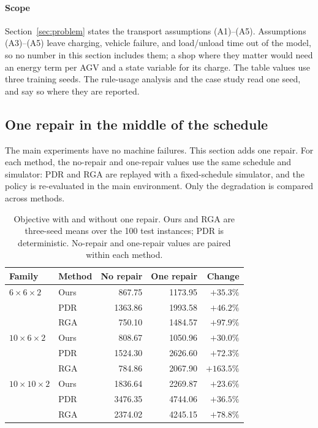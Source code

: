 \paragraph{Scope} Section~\ref{sec:problem} states the transport
assumptions (A1)--(A5).
Assumptions (A3)--(A5) leave charging, vehicle failure, and load/unload time
out of the model, so no number in this section includes them; a shop where
they matter would need an energy term per AGV and a state variable for its
charge.
The table values use three training seeds. The rule-usage analysis and the
case study read one seed, and say so where they are reported.




\subsection{One repair in the middle of the schedule}
\label{sec:repair}

The main experiments have no machine failures. This section adds one repair.
For each method, the no-repair and one-repair values use the same schedule and
simulator: PDR and RGA are replayed with a fixed-schedule simulator, and the
policy is re-evaluated in the main environment. Only the degradation is
compared across methods.

\begin{table}[t]
\centering
\caption{Objective with and without one repair. Ours and RGA are three-seed
means over the 100 test instances; PDR is deterministic. No-repair and
one-repair values are paired within each method.}
\label{tab:repair}
\setlength{\tabcolsep}{4pt}
\begin{tabular}{llrrr}
\toprule
Family & Method & No repair & One repair & Change \\
\midrule
$6\times6\times2$ & Ours & 867.75 & 1173.95 & $+35.3\%$ \\
 & PDR & 1363.86 & 1993.58 & $+46.2\%$ \\
 & RGA & 750.10 & 1484.57 & $+97.9\%$ \\
\midrule
$10\times6\times2$ & Ours & 808.67 & 1050.96 & $+30.0\%$ \\
 & PDR & 1524.30 & 2626.60 & $+72.3\%$ \\
 & RGA & 784.86 & 2067.90 & $+163.5\%$ \\
\midrule
$10\times10\times2$ & Ours & 1836.64 & 2269.87 & $+23.6\%$ \\
 & PDR & 3476.35 & 4744.06 & $+36.5\%$ \\
 & RGA & 2374.02 & 4245.15 & $+78.8\%$ \\
\bottomrule
\end{tabular}
\end{table}

